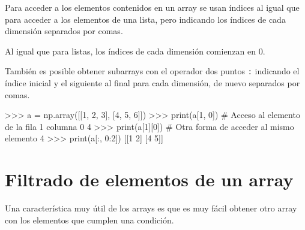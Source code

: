 \documentclass[
  spanish,
  a4paper,
]{scrreport}
\newenvironment{Shaded}{\begin{snugshade}}{\end{snugshade}}
\newcommand{\BuiltInTok}[1]{\textcolor[rgb]{0.00,0.23,0.31}{#1}}
\newcommand{\CommentTok}[1]{\textcolor[rgb]{0.37,0.37,0.37}{#1}}
\newcommand{\DecValTok}[1]{\textcolor[rgb]{0.68,0.00,0.00}{#1}}
\newcommand{\NormalTok}[1]{\textcolor[rgb]{0.00,0.23,0.31}{#1}}
\newcommand{\OperatorTok}[1]{\textcolor[rgb]{0.37,0.37,0.37}{#1}}
\begin{document}
Para acceder a los elementos contenidos en un array se usan índices al
igual que para acceder a los elementos de una lista, pero indicando los
índices de cada dimensión separados por comas.

Al igual que para listas, los índices de cada dimensión comienzan en 0.

También es posible obtener subarrays con el operador dos puntos
\texttt{:} indicando el índice inicial y el siguiente al final para cada
dimensión, de nuevo separados por comas.

\begin{Shaded}
\begin{Highlighting}[]
\OperatorTok{\textgreater{}\textgreater{}\textgreater{}}\NormalTok{ a }\OperatorTok{=}\NormalTok{ np.array([[}\DecValTok{1}\NormalTok{, }\DecValTok{2}\NormalTok{, }\DecValTok{3}\NormalTok{], [}\DecValTok{4}\NormalTok{, }\DecValTok{5}\NormalTok{, }\DecValTok{6}\NormalTok{]])}
\OperatorTok{\textgreater{}\textgreater{}\textgreater{}} \BuiltInTok{print}\NormalTok{(a[}\DecValTok{1}\NormalTok{, }\DecValTok{0}\NormalTok{])  }\CommentTok{\# Acceso al elemento de la fila 1 columna 0}
\DecValTok{4}
\OperatorTok{\textgreater{}\textgreater{}\textgreater{}} \BuiltInTok{print}\NormalTok{(a[}\DecValTok{1}\NormalTok{][}\DecValTok{0}\NormalTok{])  }\CommentTok{\# Otra forma de acceder al mismo elemento}
\DecValTok{4}
\OperatorTok{\textgreater{}\textgreater{}\textgreater{}} \BuiltInTok{print}\NormalTok{(a[:, }\DecValTok{0}\NormalTok{:}\DecValTok{2}\NormalTok{])}
\NormalTok{[[}\DecValTok{1} \DecValTok{2}\NormalTok{]}
\NormalTok{ [}\DecValTok{4} \DecValTok{5}\NormalTok{]]}
\end{Highlighting}
\end{Shaded}

\section{Filtrado de elementos de un
array}\label{filtrado-de-elementos-de-un-array}

Una característica muy útil de los arrays es que es muy fácil obtener
otro array con los elementos que cumplen una condición.
\end{document}
